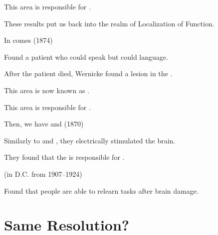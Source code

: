 \begin{coloredlist}
\begin{coloredlist}
        \item This area is responsible for .
        \item These results put us back into the realm of Localization of Function.
    \end{coloredlist}
    \item In comes  (1874)
    \begin{coloredlist}
        \item Found a patient who could speak but could  language.
        \item After the patient died, Wernicke found a lesion in the .
        \item This area is now known as .
        \item This area is responsible for .
    \end{coloredlist}
    \item Then, we have  and  (1870)
    \begin{coloredlist}
        \item Similarly to  and , they electrically stimulated the brain.
        \item They found that the  is responsible for .
    \end{coloredlist}
    \item {} (in D.C. from 1907--1924)
    \begin{coloredlist}
        \item Found that people are able to relearn tasks after brain damage.
    \end{coloredlist}
\end{coloredlist}

\section{Same Resolution?}

